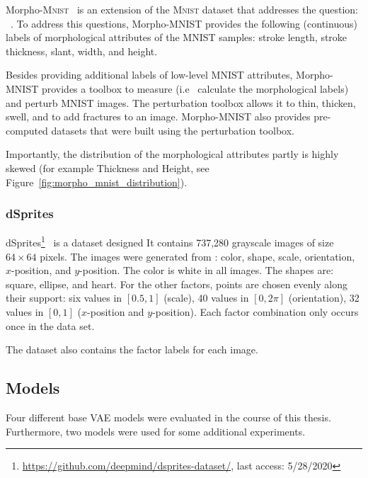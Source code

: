 Morpho-\textsc{Mnist}~\citep{castro2019morpho} is an extension of the \textsc{Mnist} dataset that addresses the question:  ~\citep{castro2019morpho}.
To address this questions, Morpho-MNIST provides the following (continuous) labels of morphological attributes of the MNIST samples: stroke length, stroke thickness, slant, width, and height.

Besides providing additional labels of low-level MNIST attributes, Morpho-MNIST provides a toolbox to measure (i.e~ calculate the morphological labels) and perturb MNIST images.
The perturbation toolbox allows it to thin, thicken, swell, and to add fractures to an image.
Morpho-MNIST also provides pre-computed datasets that were built using the perturbation toolbox.

Importantly, the distribution of the morphological attributes partly is highly skewed (for example Thickness and Height, see Figure~\ref{fig:morpho_mnist_distribution}).

\subsubsection{dSprites}
dSprites\footnote{\href{https://github.com/deepmind/dsprites-dataset/}{https://github.com/deepmind/dsprites-dataset/}, last access: 5/28/2020}~\citep{dsprites17} is a dataset designed 
It contains 737,280 grayscale images of size $64\times 64$ pixels.
The images were generated from : color, shape, scale, orientation, $x$-position, and $y$-position.
The color is white in all images.
The shapes are: square, ellipse, and heart.
For the other factors, points are chosen evenly along their support: six values in $[0.5, 1]$ (scale), 40 values in $[0, 2\pi]$ (orientation), 32 values in $[0, 1]$ ($x$-position and $y$-position).
Each factor combination only occurs once in the data set.

The dataset also contains the factor labels for each image.

\subsection{Models}\label{subsec:models}

Four different base \ac{VAE} models were evaluated in the course of this thesis.
Furthermore, two  models were used for some additional experiments.

